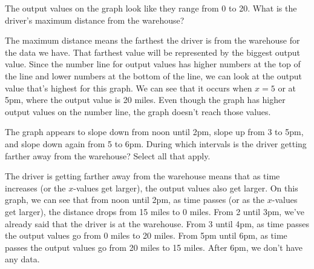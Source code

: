 \documentclass{ximera}
\begin{document}
\begin{example}
The output values on the graph look like they range from 0 to 20. What is the driver's maximum distance from the warehouse?
\begin{multipleChoice}
\begin{feedback}[correct]
The maximum distance means the farthest the driver is from the warehouse for the data we have. That farthest value will be represented by the biggest output value. Since the number line for output values has higher numbers at the top of the line and lower numbers at the bottom of the line, we can look at the output value that's highest for this graph. We can see that it occurs when $x=5$ or at 5pm, where the output value is 20 miles. Even though the graph has higher output values on the number line, the graph doesn't reach those values.
\end{feedback}
\end{multipleChoice}

The graph appears to slope down from noon until 2pm, slope up from 3 to 5pm, and slope 
down again from 5 to 6pm. During which intervals is the driver getting farther away from 
the warehouse? Select all that apply.
\begin{selectAll}
\begin{feedback}[attempt]
The driver is getting farther away from the warehouse means that as time increases (or the $x$-values get larger), the output values also get larger. On this graph, we can see that from noon until 2pm, as time passes (or as the $x$-values get larger), the distance drops from 15 miles to 0 miles. From 2 until 3pm, we've already said that the driver is at the warehouse. From 3 until 4pm, as time passes the output values go from 0 miles to 20 miles. From 5pm until 6pm, as time passes the output values go from 20 miles to 15 miles. After 6pm, we don't have any data.
\end{feedback}
\end{selectAll}


\end{example}
\end{document}

